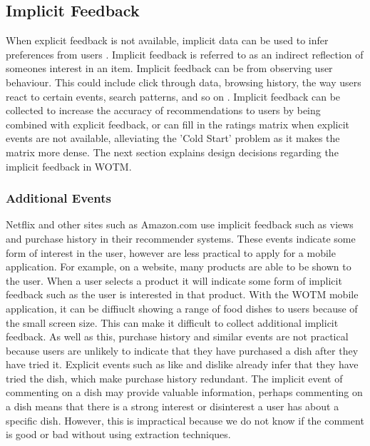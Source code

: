 \subsection{Implicit Feedback}

When explicit feedback is not available, implicit data can be used to infer preferences from users \cite{koren2009matrix}. Implicit feedback is referred to as an indirect reflection of someones interest in an item. Implicit feedback can be from observing user behaviour. This could include click through data, browsing history, the way users react to certain events, search patterns, and so on \cite{koren2009matrix}. Implicit feedback can be collected to increase the accuracy of recommendations to users by being combined with explicit feedback, or can fill in the ratings matrix when explicit events are not available, alleviating the 'Cold Start' problem as it makes the matrix more dense. The next section explains design decisions regarding the implicit feedback in WOTM.

\subsubsection{Additional Events}

Netflix \cite{koren2009matrix} and other sites such as Amazon.com \cite{schafer2007collaborative} use implicit feedback such as views and purchase history in their recommender systems. These events indicate some form of interest in the user, however are less practical to apply for a mobile application. For example, on a website, many products are able to be shown to the user. When a user selects a product it will indicate some form of implicit feedback such as the user is interested in that product. With the WOTM mobile application, it can be diffiuclt showing a range of food dishes to users because of the small screen size. This can make it difficult to collect additional implicit feedback. As well as this, purchase history and similar events are not practical because users are unlikely to indicate that they have purchased a dish after they have tried it. Explicit events such as like and dislike already infer that they have tried the dish, which make purchase history redundant. The implicit event of commenting on a dish may provide valuable information, perhaps commenting on a dish means that there is a strong interest or disinterest a user has about a specific dish. However, this is impractical because we do not know if the comment is good or bad without using extraction techniques.

